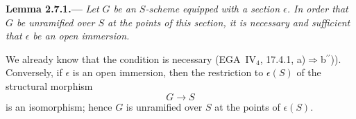 \medskip
{}\label{lem:sga3-VIB-2.7.1}%
\noindent\textbf{Lemma 2.7.1.---}
\emph{Let \(G\) be an \(S\)-scheme equipped with a section
\(\epsilon\). In order that \(G\) be unramified over \(S\) at the
points of this section, it is necessary and sufficient that
\(\epsilon\) be an open immersion.}

We already know that the condition is necessary (EGA~IV\(_4\), 17.4.1,
\textup{a)}\(\Rightarrow\)\textup{b\(^{\prime\prime}\)})).
Conversely, if \(\epsilon\) is an open immersion, then the
restriction to \(\epsilon(S)\) of the structural morphism
\[
  G\longrightarrow S
\]
is an isomorphism; hence \(G\) is unramified over \(S\) at the
points of \(\epsilon(S)\).
